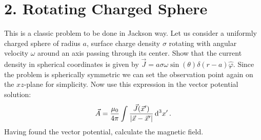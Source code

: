 \documentclass[a4paper,twoside]{article}
\begin{document}
\section*{2. Rotating Charged Sphere}
This is a classic problem to be done in Jackson way. Let us consider a uniformly charged sphere of radius $ a $, surface charge density $\sigma$ rotating with angular velocity $\omega$ around an axis passing through its center. Show that the current density in spherical coordinates is given by $ \vec{J} = a \sigma \omega \sin(\theta) \delta(r-a) \hat{\varphi} $. Since the problem is spherically symmetric we can set the observation point again on the $ xz $-plane for simplicity. Now use this expression in the vector potential solution:
\begin{equation}
    \vec{A} = \frac{\mu_0}{4 \pi} \int \frac{ \vec{J}( \vec{x}')}{\abs{ \vec{x} - \vec{x}'}} \dd[3]{x'}.
\end{equation}
Having found the vector potential, calculate the magnetic field.
\end{document}
